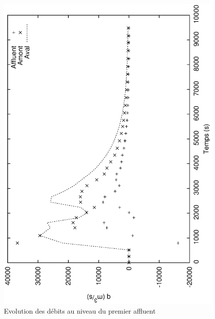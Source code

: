 \documentclass[a4paper,10pt]{article}
\begin{document}
\begin{figure}
 \begin{center}
  \includegraphics[angle=270,width=15cm]{deb_aff.eps}
  \caption{Evolution des débits au niveau du premier affluent}
  \label{fig7}
 \end{center}
\end{figure}

%
%
\end{document}
